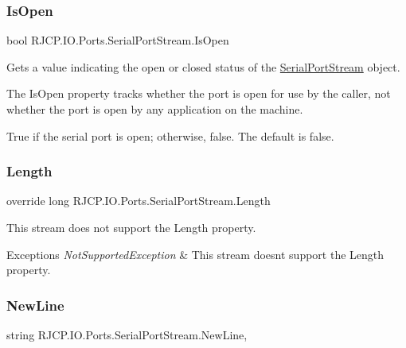 \subsubsection{\texorpdfstring{IsOpen}{IsOpen}}
{\footnotesize\ttfamily bool R\+J\+C\+P.\+I\+O.\+Ports.\+Serial\+Port\+Stream.\+Is\+Open\hspace{0.3cm}{\ttfamily [get]}}



Gets a value indicating the open or closed status of the \mbox{\hyperlink{class_r_j_c_p_1_1_i_o_1_1_ports_1_1_serial_port_stream}{Serial\+Port\+Stream}} object. 

The Is\+Open property tracks whether the port is open for use by the caller, not whether the port is open by any application on the machine. 

True if the serial port is open; otherwise, false. The default is false. \mbox{\label{class_r_j_c_p_1_1_i_o_1_1_ports_1_1_serial_port_stream_a2c6a6e49a6ce101533aea649a76db3a7}} 
\subsubsection{\texorpdfstring{Length}{Length}}
{\footnotesize\ttfamily override long R\+J\+C\+P.\+I\+O.\+Ports.\+Serial\+Port\+Stream.\+Length\hspace{0.3cm}{\ttfamily [get]}}



This stream does not support the Length property. 


\begin{DoxyExceptions}{Exceptions}
{\em Not\+Supported\+Exception} & This stream doesn\textquotesingle{}t support the Length property.\\
\hline
\end{DoxyExceptions}
\mbox{\label{class_r_j_c_p_1_1_i_o_1_1_ports_1_1_serial_port_stream_a74d04b36e5fb7701378a64584eefbd40}} 
\subsubsection{\texorpdfstring{NewLine}{NewLine}}
{\footnotesize\ttfamily string R\+J\+C\+P.\+I\+O.\+Ports.\+Serial\+Port\+Stream.\+New\+Line\hspace{0.3cm}{\ttfamily [get]}, {\ttfamily [set]}}




